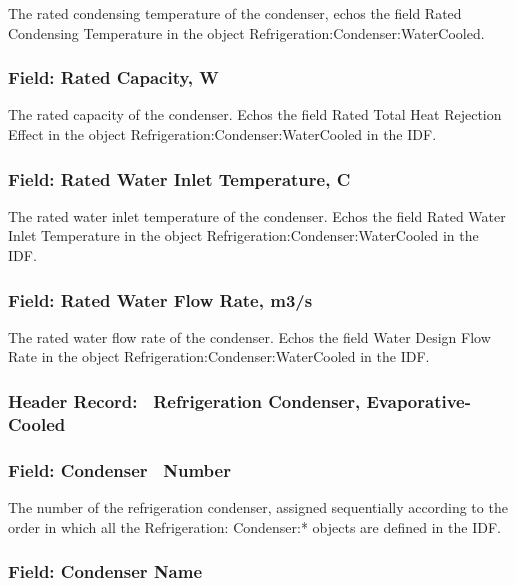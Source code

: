 The rated condensing temperature of the condenser, echos the field Rated Condensing Temperature in the object Refrigeration:Condenser:WaterCooled.

\subsubsection{Field: Rated Capacity, W}\label{field-rated-capacity-w-1}

The rated capacity of the condenser. Echos the field Rated Total Heat Rejection Effect in the object Refrigeration:Condenser:WaterCooled in the IDF.

\subsubsection{Field: Rated Water Inlet Temperature, C}\label{field-rated-water-inlet-temperature-c}

The rated water inlet temperature of the condenser. Echos the field Rated Water Inlet Temperature in the object Refrigeration:Condenser:WaterCooled in the IDF.

\subsubsection{Field: Rated Water Flow Rate, m3/s}\label{field-rated-water-flow-rate-m3s}

The rated water flow rate of the condenser. Echos the field Water Design Flow Rate in the object Refrigeration:Condenser:WaterCooled in the IDF.

\subsubsection{Header Record:~ Refrigeration Condenser, Evaporative-Cooled}\label{header-record-refrigeration-condenser-evaporative-cooled}

\subsubsection{Field: Condenser~ Number}\label{field-condenser-number-3}

The number of the refrigeration condenser, assigned sequentially according to the order in which all the Refrigeration: Condenser:* objects are defined in the IDF.

\subsubsection{Field: Condenser Name}\label{field-condenser-name-3}

